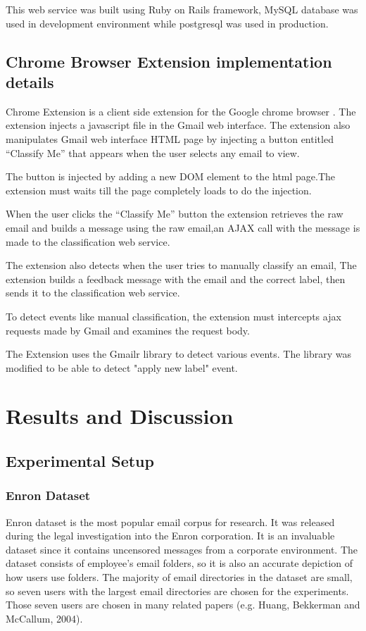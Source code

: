    This web service was built using Ruby on Rails \cite{ROR} framework, MySQL database was used
    in development environment while postgresql was used in production.


\subsection{Chrome Browser Extension implementation details}
    Chrome Extension is a client side extension for the Google chrome browser \cite{CHROME}.
    The extension injects a javascript file in the Gmail web interface. The extension also manipulates
    Gmail web interface HTML page by injecting a button entitled ``Classify Me''
    that appears when the user selects any email to view.

    The button is injected by adding a new DOM element to the html page.The extension must waits till
    the page completely loads to do the injection.

    When the user clicks the ``Classify Me'' button the extension retrieves the raw email and
    builds a message using the raw email,an AJAX call with the message is made to the 
    classification web service.

    The extension also detects when the user tries to manually classify an email, The extension builds
    a feedback message with the email and the correct label, then sends it to the classification 
    web service.

    To detect events like manual classification, the extension must intercepts ajax requests made by
    Gmail and examines the request body.

    The Extension uses the Gmailr library \cite{GMAILR} to detect various events. The library was modified 
    to be able to detect "apply new label" event.

\section{Results and Discussion}
\label{sec:6_results_discussion}
\subsection{Experimental Setup}

\subsubsection{Enron Dataset \cite{ENRON}}
Enron dataset is the most popular email corpus for research. It was released 
during the legal investigation into the Enron corporation.
It is an invaluable dataset since it contains uncensored messages from a 
corporate environment. The dataset consists of employee's email folders, 
so it is also an accurate depiction of how users use folders. The majority 
of email directories in the dataset are small, so seven users with the largest 
email directories are chosen for the experiments. Those seven users are chosen 
in many related papers (e.g. Huang, Bekkerman and McCallum, 2004\cite{RON04}).

